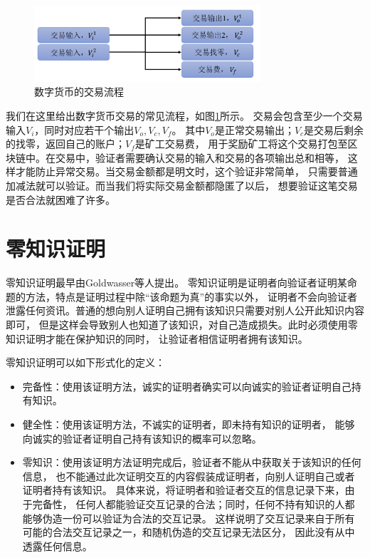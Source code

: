 \begin{figure}
    \centering
    \includegraphics[width=0.75\textwidth]{figures/transaction.png}
    \caption{数字货币的交易流程}
    \label{fig:transaction}
\end{figure}

我们在这里给出数字货币交易的常见流程，如图\ref{fig:transaction}所示。
交易会包含至少一个交易输入$V_i$，同时对应若干个输出$V_o, V_c, V_f$。
其中$V_o$是正常交易输出；$V_c$是交易后剩余的找零，返回自己的账户；$V_f$是矿工交易费，
用于奖励矿工将这个交易打包至区块链中。在交易中，验证者需要确认交易的输入和交易的各项输出总和相等，
这样才能防止异常交易。当交易金额都是明文时，这个验证非常简单，
只需要普通加减法就可以验证。而当我们将实际交易金额都隐匿了以后，
想要验证这笔交易是否合法就困难了许多。

\section{零知识证明}

零知识证明最早由Goldwasser等人提出\cite{goldwasser1989knowledge}。
零知识证明是证明者向验证者证明某命题的方法，特点是证明过程中除``该命题为真''的事实以外，
证明者不会向验证者泄露任何资讯。普通的想向别人证明自己拥有该知识只需要对别人公开此知识内容即可，
但是这样会导致别人也知道了该知识，对自己造成损失。此时必须使用零知识证明才能在保护知识的同时，
让验证者相信证明者拥有该知识。

零知识证明可以如下形式化的定义：

\begin{itemize}
    \item 完备性：使用该证明方法，诚实的证明者确实可以向诚实的验证者证明自己持有知识。
    \item 健全性：使用该证明方法，不诚实的证明者，即未持有知识的证明者，
    能够向诚实的验证者证明自己持有该知识的概率可以忽略。
    \item 零知识：使用该证明方法证明完成后，验证者不能从中获取关于该知识的任何信息，
    也不能通过此次证明交互的内容假装成证明者，向别人证明自己或者证明者持有该知识。
    具体来说，将证明者和验证者交互的信息记录下来，由于完备性，
    任何人都能验证交互记录的合法；同时，任何不持有知识的人都能够伪造一份可以验证为合法的交互记录。
    这样说明了交互记录来自于所有可能的合法交互记录之一，和随机伪造的交互记录无法区分，
    因此没有从中透露任何信息。
\end{itemize}

